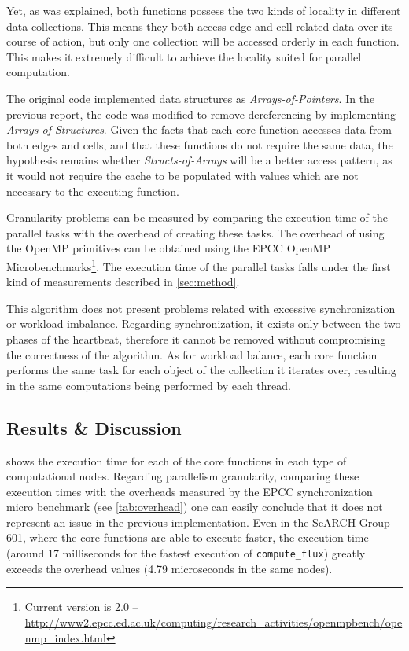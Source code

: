 \documentclass[abstract=on,9pt,twocolumn]{scrartcl}
\begin{document}
Yet, as was explained, both functions possess the two kinds of locality in different data collections. This means they both access edge and cell related data over its course of action, but only one collection will be accessed orderly in each function. This makes it extremely difficult to achieve the locality suited for parallel computation.

The original code implemented data structures as \textit{Arrays-of-Pointers}. In the previous report, the code was modified to remove dereferencing by implementing \textit{Arrays-of-Structures}. Given the facts that each core function accesses data from both edges and cells, and that these functions do not require the same data, the hypothesis remains whether \textit{Structs-of-Arrays} will be a better access pattern, as it would not require the cache to be populated with values which are not necessary to the executing function.

Granularity problems can be measured by comparing the execution time of the parallel tasks with the overhead of creating these tasks. The overhead of using the OpenMP primitives can be obtained using the EPCC OpenMP Microbenchmarks\footnote{Current version is 2.0 -- \url{http://www2.epcc.ed.ac.uk/computing/research_activities/openmpbench/openmp_index.html}}. The execution time of the parallel tasks falls under the first kind of measurements described in \cref{sec:method}.

This algorithm does not present problems related with excessive synchronization or workload imbalance. Regarding synchronization, it exists only between the two phases of the heartbeat, therefore it cannot be removed without compromising the correctness of the algorithm. As for workload balance, each core function performs the same task for each object of the collection it iterates over, resulting in the same computations being performed by each thread.



\subsection{Results \& Discussion}
\label{sec:aos:results}
 shows the execution time for each of the core functions in each type of computational nodes. Regarding parallelism granularity, comparing these execution times with the overheads measured by the EPCC synchronization micro benchmark (see \cref{tab:overhead}) one can easily conclude that it does not represent an issue in the previous implementation. Even in the SeARCH Group 601, where the core functions are able to execute faster, the execution time (around 17 milliseconds for the fastest execution of \texttt{compute\_flux}) greatly exceeds the overhead values (4.79 microseconds in the same nodes).
\end{document}
